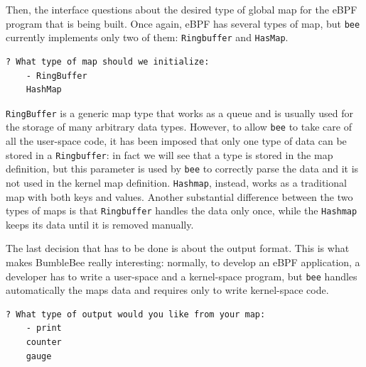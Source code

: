Then, the interface questions about the desired type of global map for the eBPF program that is being built.
Once again, eBPF has several types of map, but \colorbox{backcolour}{\lstinline[style=highlight, language=bash]|bee|} currently implements only two of them: \colorbox{backcolour}{\lstinline[style=highlight, language=bash]|Ringbuffer|} and \colorbox{backcolour}{\lstinline[style=highlight, language=bash]|HasMap|}.

\begin{lstlisting}[style=commandline, language=bash, caption={bee map type selection}]
	? What type of map should we initialize: 
	- RingBuffer
	HashMap
\end{lstlisting}

\colorbox{backcolour}{\lstinline[style=highlight, language=bash]|RingBuffer|} is a generic map type that works as a queue and is usually used for the storage of many arbitrary data types.
However, to allow \colorbox{backcolour}{\lstinline[style=highlight, language=bash]|bee|} to take care of all the user-space code, it has been imposed that only one type of data can be stored in a \colorbox{backcolour}{\lstinline[style=highlight, language=bash]|Ringbuffer|}: in fact we will see that a type is stored in the map definition, but this parameter is used by \colorbox{backcolour}{\lstinline[style=highlight, language=bash]|bee|} to correctly parse the data and it is not used in the kernel map definition. 
\colorbox{backcolour}{\lstinline[style=highlight, language=bash]|Hashmap|}, instead, works as a traditional map with both keys and values.
Another substantial difference between the two types of maps is that \colorbox{backcolour}{\lstinline[style=highlight, language=bash]|Ringbuffer|} handles the data only once, while the \colorbox{backcolour}{\lstinline[style=highlight, language=bash]|Hashmap|} keeps its data until it is removed manually.

The last decision that has to be done is about the output format.
This is what makes BumbleBee really interesting: normally, to develop an eBPF application, a developer has to write a user-space and a kernel-space program, but \colorbox{backcolour}{\lstinline[style=highlight, language=bash]|bee|} handles automatically the maps data and requires only to write kernel-space code.

\begin{lstlisting}[style=commandline, language=bash, caption={bee output format selection}]
	? What type of output would you like from your map: 
	- print
	counter
	gauge
\end{lstlisting}


